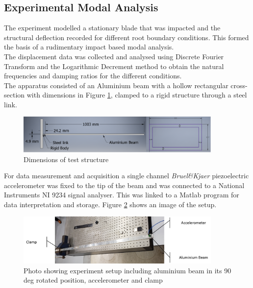 \documentclass[11pt]{article}
\begin{document}
\subsection{Experimental Modal Analysis}
The experiment modelled a stationary blade that was impacted and the structural deflection recorded for different root boundary conditions. This formed the basis of a rudimentary impact based modal analysis. \\
The displacement data was collected and analysed using Discrete Fourier Transform and the Logarithmic Decrement method to obtain the natural frequencies and damping ratios for the different conditions.\\
The apparatus consisted of an Aluminium beam with a hollow rectangular cross-section with dimensions in Figure \ref{fig:dim}, clamped to a rigid structure through a steel link.\\

\begin{figure}[H]
    \centering
    \includegraphics[width=0.9\textwidth]{dimensions.PNG}
    \caption{Dimensions of test structure}
    \label{fig:dim}
\end{figure}{}
For data measurement and acquisition a single channel \textit{Bruel\&Kjaer} piezoelectric accelerometer was fixed to the tip of the beam and was connected to a National Instruments NI 9234 signal analyser. This was linked to a Matlab program for data interpretation and storage. Figure \ref{fig:photo} shows an image of the setup.
\begin{figure}[H]
    \centering
    \includegraphics[width=0.9\textwidth]{photoedit.PNG}
    \caption{Photo showing experiment setup including aluminium beam in its 90 deg rotated position, accelerometer and clamp}
    \label{fig:photo}
\end{figure}{}
\end{document}
